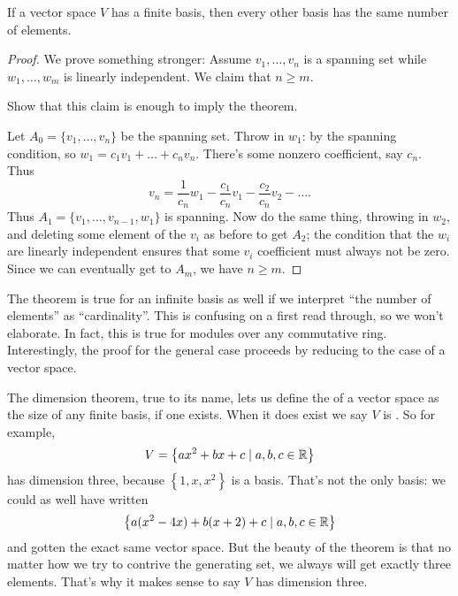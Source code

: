 \begin{theorem}
	If a vector space $V$ has a finite basis,
	then every other basis has the same number of elements.
\end{theorem}
\begin{proof}
	We prove something stronger:
	Assume $v_1, \dots, v_n$ is a spanning set
	while $w_1, \dots, w_m$ is linearly independent. We claim that $n \ge m$.
	\begin{ques}
		Show that this claim is enough to imply the theorem.
	\end{ques}

	Let $A_0 = \{v_1, \dots, v_n\}$ be the spanning set.
	Throw in $w_1$: by the spanning condition,
	so $w_1 = c_1 v_1 + \dots + c_n v_n$.
	There's some nonzero coefficient, say $c_n$.
	Thus \[ v_n = \frac{1}{c_n} w_1 - \frac{c_1}{c_n}v_1 - \frac{c_2}{c_n}v_2 - \dots. \]
	Thus $A_1 = \{v_1, \dots, v_{n-1}, w_1\}$ is spanning.
	Now do the same thing, throwing in $w_2$,
	and deleting some element of the $v_i$ as before to get $A_2$;
	the condition that the $w_i$ are linearly independent
	ensures that some $v_i$ coefficient
	must always not be zero.
	Since we can eventually get to $A_m$, we have $n \ge m$.
\end{proof}
\begin{remark}
	[Generalizations]
	\begin{itemize}
		\ii The theorem is true for an infinite basis as well
		if we interpret ``the number of elements'' as ``cardinality''.
		This is confusing on a first read through, so we won't elaborate.
		\ii In fact, this is true for modules over any commutative ring.
		Interestingly, the proof for the general case proceeds by reducing
		to the case of a vector space.
	\end{itemize}
\end{remark}

The dimension theorem, true to its name,
lets us define the  of
a vector space as the size of any finite basis, if one exists.
When it does exist we say $V$ is .
So for example,
\[ V = \left\{ ax^2 + bx + c \mid a,b,c \in \mathbb R \right\} \]
has dimension three, because $\left\{ 1,x,x^2 \right\}$ is a basis.
That's not the only basis: we could as well have written
\[ \left\{ a(x^2-4x) + b(x+2) + c \mid a,b,c \in \mathbb R \right\} \]
and gotten the exact same vector space.
But the beauty of the theorem is that no matter how we try
to contrive the generating set, we always will get exactly three elements.
That's why it makes sense to say $V$ has dimension three.

